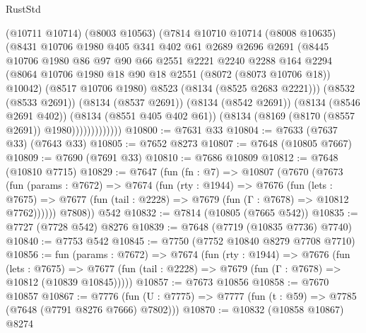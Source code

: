 \begin{lexlean}{RustStd}
\begin{coremodule}
{\begin{coremodule}
{{{{{{{{{{{{{{{{{{{{{{{{{{{{{{{{{{{{{{{{{{{{{{{{{{{{{                      (@10711 @10714)
                      (@8003 @10563)
                      (@7814
                        @10710
                        @10714
                        (@8008 @10635)
                        (@8431
                          @10706
                          @1980
                          @405
                          @341
                          @402
                          @61
                          @2689
                          @2696
                          @2691
                          (@8445
                            @10706
                            @1980
                            @86
                            @97
                            @90
                            @66
                            @2551
                            @2221
                            @2240
                            @2288
                            @164
                            @2294
                            (@8064 @10706 @1980 @18 @90 @18 @2551 (@8072 (@8073 @10706 @18)) @10042)
                            (@8517 @10706 @1980)
                            @8523
                            (@8134 (@8525 @2683 @2221)))
                          (@8532 (@8533 @2691))
                          (@8134 (@8537 @2691))
                          (@8134 (@8542 @2691))
                          (@8134 (@8546 @2691 @402))
                          (@8134 (@8551 @405 @402 @61))
                          (@8134 (@8169 (@8170 (@8557 @2691)) @1980)))))))))))))
@10800 := @7631 @33
@10804 := @7633 (@7637 @33) (@7643 @33)
@10805 := @7652 @8273
@10807 := @7648 (@10805 @7667)
@10809 := @7690 (@7691 @33)
@10810 := @7686 @10809
@10812 := @7648 (@10810 @7715)
@10829 := @7647
    (fun (fn : @7) =>
    @10807
      (@7670
        (@7673
          (fun (params : @7672) =>
          @7674
            (fun (rty : @1944) =>
            @7676
              (fun (lets : @7675) =>
              @7677 (fun (tail : @2228) => @7679 (fun (Γ : @7678) => @10812 @7762))))))
        @7808))
    @542
@10832 := @7814 (@10805 (@7665 @542))
@10835 := @7727 (@7728 @542) @8276
@10839 := @7648 (@7719 (@10835 @7736) @7740)
@10840 := @7753 @542
@10845 := @7750 (@7752 @10840 @8279 @7708 @7710)
@10856 := fun (params : @7672) =>
  @7674
    (fun (rty : @1944) =>
    @7676
      (fun (lets : @7675) =>
      @7677 (fun (tail : @2228) => @7679 (fun (Γ : @7678) => @10812 (@10839 @10845)))))
@10857 := @7673 @10856
@10858 := @7670 @10857
@10867 := @7776
    (fun (U : @7775) => @7777 (fun (t : @59) => @7785 (@7648 (@7791 @8276 @7666) @7802)))
@10870 := @10832 (@10858 @10867) @8274
}}}}}}}}}}}}}}}}}}}}}}}}}}}}}}}}}}}}}}}}}}}}}}}}}}}}}
\end{coremodule}}
\end{coremodule}
\end{lexlean}
